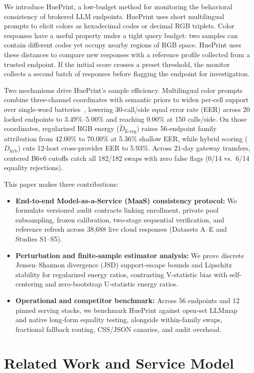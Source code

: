 \documentclass[10pt,journal,compsoc]{IEEEtran}
\newcommand{\Dereg}{\tilde D_{\mathrm{E\mbox{-}reg}}}
\newcommand{\Dhyb}{D_{\mathrm{hyb}}}
\begin{document}
We introduce HuePrint, a low-budget method for monitoring the
behavioral consistency of brokered LLM endpoints. HuePrint uses short
multilingual prompts to elicit colors as hexadecimal codes or decimal
RGB triplets. Color responses have a useful property under a tight
query budget: two samples can contain different codes yet occupy
nearby regions of RGB space. HuePrint uses these distances to compare
new responses with a reference profile collected from a trusted
endpoint. If the initial score crosses a preset threshold, the monitor
collects a second batch of responses before flagging the endpoint for
investigation.

Two mechanisms drive HuePrint's sample efficiency. Multilingual color prompts combine three-channel coordinates with semantic priors to widen per-cell support over single-word batteries~\cite{ref7}, lowering 30-call/side equal error rate (EER) across 20 locked endpoints to 3.49\%--5.00\% and reaching 0.00\% at 150 calls/side. On those coordinates, regularized RGB energy ($\Dereg{}$) raises 56-endpoint family attribution from 42.00\% to 70.00\% at 5.36\% shallow EER, while hybrid scoring ($\Dhyb{}$) cuts 12-host cross-provider EER to 5.93\%. Across 21-day gateway transfers, centered B6v6 cutoffs catch all 182/182 swaps with zero false flags (0/14 vs.\ 6/14 equality rejections).

This paper makes three contributions:
\begin{itemize}
    \item \textbf{End-to-end Model-as-a-Service (MaaS) consistency protocol:} We formulate versioned audit contracts linking enrollment, private pool subsampling, frozen calibration, two-stage sequential verification, and reference refresh across 38,688 live cloud responses (Datasets A--E and Studies S1--S5).
    \item \textbf{Perturbation and finite-sample estimator analysis:} We prove discrete Jensen--Shannon divergence (JSD) support-escape bounds and Lipschitz stability for regularized energy ratios, contrasting V-statistic bias with self-centering and zero-bootstrap U-statistic energy ratios.
    \item \textbf{Operational and competitor benchmark:} Across 56 endpoints and 12 pinned serving stacks, we benchmark HuePrint against open-set LLMmap and native long-form equality testing, alongside within-family swaps, fractional fallback routing, CSS/JSON canaries, and audit overhead.
\end{itemize}

\section{Related Work and Service Model}
\end{document}
